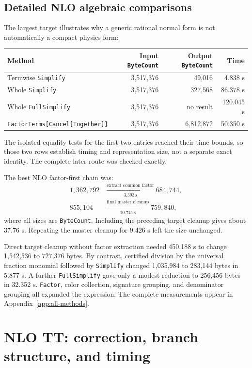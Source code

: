 \documentclass[11pt]{article}
\newcommand{\code}[1]{\texttt{#1}}
\newcommand{\Sec}{\,\mathrm{s}}
\begin{document}
\subsection{Detailed NLO algebraic comparisons}

The largest target illustrates why a generic rational normal form is not
automatically a compact physics form:
\begin{center}
\begin{tabular}{@{}lrrr@{}}
\toprule
Method & Input \code{ByteCount} & Output \code{ByteCount} & Time \\
\midrule
Termwise \code{Simplify} & 3,517,376 & 49,016 & 4.838 s \\
Whole \code{Simplify} & 3,517,376 & 327,568 & 86.378 s \\
Whole \code{FullSimplify} & 3,517,376 & no result & 120.045 s \\
\code{FactorTerms[Cancel[Together]]} & 3,517,376 & 6,812,872 & 50.350 s \\
\bottomrule
\end{tabular}
\end{center}
\par\medskip
The isolated equality tests for the first two entries reached their time
bounds, so those two rows establish timing and representation size, not a
separate exact identity.  The complete later route was checked exactly.

The best NLO factor-first chain was:
\begin{align}
  1{,}362{,}792&\xrightarrow[3.393\Sec]{\text{extract common factor}}
  684{,}744,\\
  855{,}104&\xrightarrow[10.741\Sec]{\text{final master cleanup}}
  759{,}840,
\end{align}
where all sizes are \code{ByteCount}.  Including the preceding target cleanup
gives about 37.76 s.  Repeating the master cleanup for 9.426 s left the size
unchanged.

Direct target cleanup without factor extraction needed 450.188 s to change
1,542,536 to 727,376 bytes.  By contrast, certified division by the universal
fraction monomial followed by \code{Simplify} changed 1,035,984 to 283,144
bytes in 5.877 s.  A further \code{FullSimplify} gave only a modest reduction
to 256,456 bytes in 32.352 s.  \code{Factor}, color collection, signature
grouping, and denominator grouping all expanded the expression.  The complete
measurements appear in Appendix~\ref{app:all-methods}.

\section{NLO TT: correction, branch structure, and timing}
\end{document}
